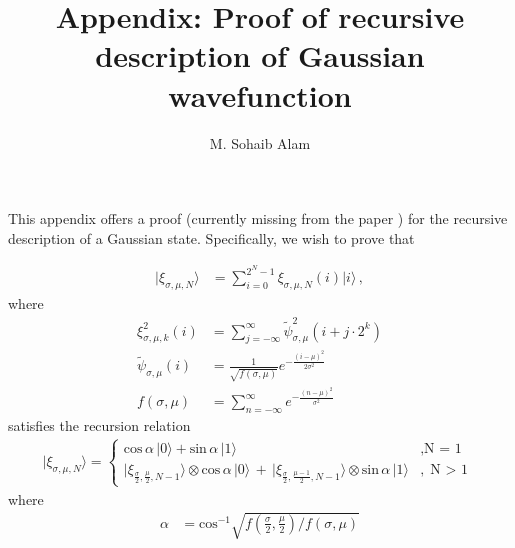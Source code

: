 \documentclass[11pt]{article}
\begin{document}
 


\title{Appendix: Proof of recursive description of Gaussian wavefunction}
\author{M. Sohaib Alam}
\maketitle

\noindent This appendix offers a proof (currently missing from the paper ) for the recursive description of a Gaussian state. Specifically, we wish to prove that

\begin{align*}
\vert \xi_{\sigma, \mu, N} \rangle &= \sum_{i=0}^{2^N - 1} \xi_{\sigma, \mu, N} (i) \vert i \rangle\, , \nonumber
\end{align*}
where
\begin{align*}
\xi_{\sigma, \mu, k}^{2} (i) &= \sum_{j=-\infty}^{\infty} \tilde{\psi}_{\sigma, \mu}^{2} (i + j \cdot 2^{k}) \\
\tilde{\psi}_{\sigma, \mu} (i) &= \frac{1}{\sqrt{f(\sigma, \mu)}} e^{-\frac{(i-\mu)^2}{2\sigma^2}} \\
f(\sigma, \mu) &= \sum_{n=-\infty}^{\infty} e^{-\frac{(n-\mu)^2}{\sigma^2}}
\end{align*}
satisfies the recursion relation
\begin{align}
\vert \xi_{\sigma, \mu, N} \rangle = \left\{ \begin{array}{ll}
\text{cos} \, \alpha \, \vert 0 \rangle + \text{sin} \, \alpha \, \vert 1 \rangle &, \text{N = 1} \\
  \vert \xi_{\frac{\sigma}{2}, \frac{\mu}{2}, N-1} \rangle \otimes \text{cos} \, \alpha \, \vert 0 \rangle \, + \,   \vert \xi_{\frac{\sigma}{2}, \frac{\mu-1}{2}, N-1} \rangle \otimes \text{sin} \, \alpha \, \vert 1 \rangle &, \text{N $>$ 1} 
\end{array} \right. \label{eq1}
\end{align}
where
\begin{align*}
\alpha &= \text{cos}^{-1} \sqrt{f\left( \frac{\sigma}{2}, \frac{\mu}{2} \right) / f(\sigma, \mu)}
\end{align*}
\end{document}
